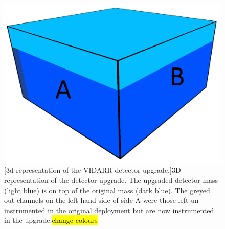 \begin{figure}[!h]
 \centering
 \includegraphics[width=0.5\linewidth]{Chapter3/Figs/detectorUpgradedmassOutlinedLabelled.png}
 [3d representation of the VIDARR detector upgrade.]{3D representation of the detector upgrade. The upgraded detector mass (light blue) is on top of the original mass (dark blue). The greyed out channels on the left hand side of side A were those left un-instrumented in the original deployment but are now instrumented in the upgrade.\hl{change colours}} 
 \label{fig:detectorUpgradedmassOutlined}
\end{figure}

